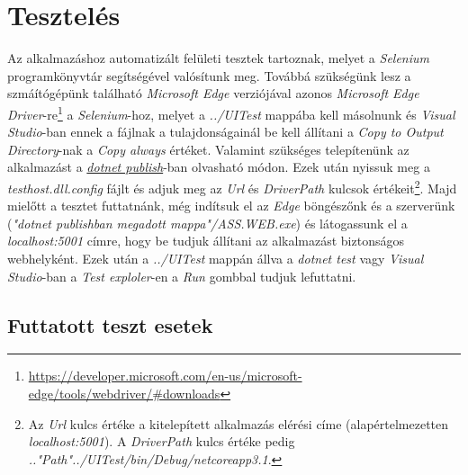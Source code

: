 \chapter{Tesztelés} %
\label{ch:test}
Az alkalmazáshoz automatizált felületi tesztek tartoznak, melyet a \emph{Selenium} \cite{Selenium} programkönyvtár segítségével valósítunk meg. Továbbá szükségünk lesz a szmáítógépünk található \emph{Microsoft Edge} verziójával azonos \emph{Microsoft Edge Driver}-re\footnote{\url{https://developer.microsoft.com/en-us/microsoft-edge/tools/webdriver/\#downloads}} a \emph{Selenium}-hoz, melyet a \emph{../UITest} mappába kell másolnunk és \emph{Visual Studio}-ban ennek a fájlnak a tulajdonságainál be kell állítani a \emph{Copy to Output Directory}-nak a \emph{Copy always} értéket. Valamint szükséges telepítenünk az alkalmazást a \hyperref[step:dotnet-publish]{\emph{dotnet publish}}-ban olvasható módon. Ezek után nyissuk meg a \emph{testhost.dll.config} fájlt és adjuk meg az \emph{Url} és \emph{DriverPath} kulcsok értékeit\footnote{Az \emph{Url} kulcs értéke a kitelepített alkalmazás elérési címe (alapértelmezetten \emph{localhost:5001}). A \emph{DriverPath} kulcs értéke pedig \emph{.."Path"../UITest/bin/Debug/netcoreapp3.1}.}. Majd mielőtt a tesztet futtatnánk, még indítsuk el az \emph{Edge} böngészőnk és a szerverünk (\emph{"dotnet publishban megadott mappa"/ASS.WEB.exe}) és látogassunk el a \emph{localhost:5001} címre, hogy be tudjuk állítani az alkalmazást biztonságos webhelyként. Ezek után a \emph{../UITest} mappán állva a \emph{dotnet test} vagy \emph{Visual Studio}-ban a \emph{Test exploler}-en a \emph{Run} gombbal tudjuk lefuttatni.
\section{Futtatott teszt esetek}
